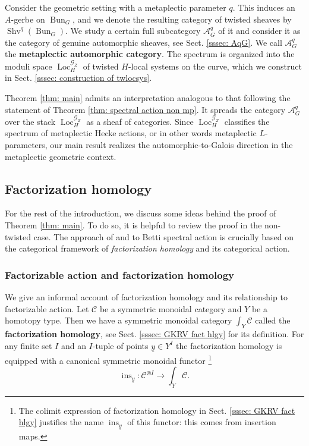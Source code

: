 \documentclass[10pt]{amsart}
\newcommand{\sssec}{\subsubsection}
\theoremstyle{remark}
\newcommand{\ul}{\underline}
\newcommand{\on}{\operatorname}
\newcommand{\cA}{\mathcal{A}}
\newcommand{\cC}{\mathcal{C}}
\newcommand{\cG}{\mathcal{G}}
\newcommand{\Shv}{\on{Shv}}
\newcommand{\Loc}{\on{Loc}}
\newcommand{\Bun}{\on{Bun}}
\begin{document}
Consider the geometric setting with a metaplectic parameter $q$. This induces an $A$-gerbe on $\Bun_G$, and we denote the resulting category of twisted sheaves by $\Shv^q(\Bun_G)$. We study a certain full subcategory $\cA^q_G$ of it and consider it as the category of genuine automorphic sheaves, see Sect. \ref{sssec: AqG}. We call $\cA^q_G$ the \textbf{metaplectic automorphic category}.
The spectrum is organized into the moduli space $\Loc^{\cG_Z}_H$ of twisted $H$-local systems on the curve, which we construct in Sect. \ref{sssec: construction of twlocsys}.
\medskip

Theorem \ref{thm: main} admits an interpretation analogous to that following the statement of Theorem \ref{thm: spectral action non mp}. It spreads the category $\cA^q_G$ over the stack $\Loc^{\cG_Z}_H$ as a sheaf of categories. Since $\Loc^{\cG_Z}_H$ classifies the spectrum of metaplectic Hecke actions, or in other words metaplectic $L$-parameters, our main result realizes the automorphic-to-Galois direction in the metaplectic geometric context.



\subsection{Factorization homology}\label{ssec: fact hlgy}
For the rest of the introduction, we discuss some ideas behind the proof of Theorem \ref{thm: main}. To do so, it is helpful to review the proof in the non-twisted case.
The approach of \cite{NY} and \cite{GKRV} to Betti spectral action is crucially based on the categorical framework of \emph{factorization homology} and its categorical action. 

\sssec{Factorizable action and factorization homology}\label{sssec: fact hlgy informal} 
We give an informal account of factorization homology and its relationship to factorizable action. Let $\cC$ be a symmetric monoidal category and $Y$ be a homotopy type. Then we have a symmetric monoidal category $\int_Y \cC$ called the \textbf{factorization homology}, see Sect. \ref{sssec: GKRV fact hlgy} for its definition. For any finite set $I$ and an $I$-tuple of points $\ul{y}\in Y^I$ the factorization homology is equipped with a canonical symmetric monoidal functor \footnote{The colimit expression of factorization homology in Sect. \ref{sssec: GKRV fact hlgy} justifies the name $\on{ins}_{\ul{y}}$ of this functor: this comes from insertion maps.}
\[\on{ins}_{\ul{y}}:\cC^{\otimes I}\rightarrow\int_Y\cC.\]
\end{document}
